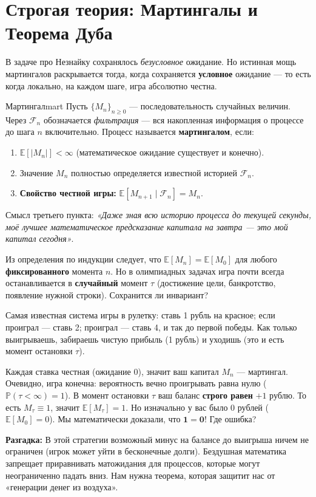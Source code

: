 \documentclass[12pt,a4paper]{article}
\renewcommand{\ge}{\geqslant}
\newcommand{\E}{\mathbb{E}}
\renewcommand{\P}{\mathbb{P}}
\newcommand{\F}{\mathcal{F}}
\begin{document}
\section{Строгая теория: Мартингалы и Теорема Дуба}

В задаче про Незнайку сохранялось \textit{безусловное} ожидание. Но истинная мощь мартингалов раскрывается тогда, когда сохраняется \textbf{условное} ожидание — то есть когда локально, на каждом шаге, игра абсолютно честна.

\begin{definition}{Мартингал}{mart}
Пусть $\{M_n\}_{n \ge 0}$ --- последовательность случайных величин. Через $\F_n$ обозначается \textit{фильтрация} --- вся накопленная информация о процессе до шага $n$ включительно. Процесс называется \textbf{мартингалом}, если:
\begin{enumerate}
    \item $\E[|M_n|] < \infty$ (математическое ожидание существует и конечно).
    \item Значение $M_n$ полностью определяется известной историей $\F_n$.
    \item \textbf{Свойство честной игры:} $\E[M_{n+1} \mid \F_n] = M_n$.
\end{enumerate}
\end{definition}

Смысл третьего пункта: \textit{«Даже зная всю историю процесса до текущей секунды, моё лучшее математическое предсказание капитала на завтра — это мой капитал сегодня»}.

Из определения по индукции следует, что $\E[M_n] = \E[M_0]$ для любого \textbf{фиксированного} момента $n$. Но в олимпиадных задачах игра почти всегда останавливается в \textbf{случайный} момент $\tau$ (достижение цели, банкротство, появление нужной строки). Сохранится ли инвариант?

\begin{paradox}
Самая известная система игры в рулетку: ставь 1 рубль на красное; если проиграл — ставь 2; проиграл — ставь 4, и так до первой победы. Как только выигрываешь, забираешь чистую прибыль (1 рубль) и уходишь (это и есть момент остановки $\tau$).

Каждая ставка честная (ожидание $0$), значит ваш капитал $M_n$ — мартингал.
Очевидно, игра конечна: вероятность вечно проигрывать равна нулю ($\P(\tau < \infty) = 1$).
В момент остановки $\tau$ ваш баланс \textbf{строго равен} $+1$ рублю. То есть $M_\tau \equiv 1$, значит $\E[M_\tau] = 1$. Но изначально у вас было 0 рублей ($\E[M_0] = 0$). Мы математически доказали, что $\mathbf{1 = 0}$! Где ошибка?

\textbf{Разгадка:} В этой стратегии возможный минус на балансе до выигрыша ничем не ограничен (игрок может уйти в бесконечные долги). Бездушная математика запрещает приравнивать матожидания для процессов, которые могут неограниченно падать вниз. Нам нужна теорема, которая защитит нас от «генерации денег из воздуха».
\end{paradox}
\end{document}
